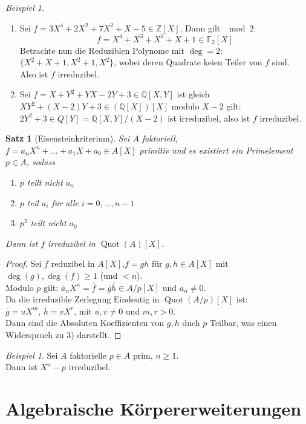 \documentclass[10pt,a4paper]{article}
\newcommand{\Z}{\ensuremath{\mathbb{Z}}}
\newcommand{\Q}{\ensuremath{\mathbb{Q}}}
\newcommand{\ol}[1]{\overline{#1}}
\newcommand{\Quot}{\operatorname{Quot}}
\newcounter{thm}[section]
\theoremstyle{definition}
\theoremstyle{plain}
\newtheorem{satz}[thm]{Satz}
\theoremstyle{remark}
\newtheorem{exm}[thm]{Beispiel}
\newtheorem*{exm*}{Beispiel}
\begin{document}
\begin{exm*}
	\begin{enumerate}
		\item Sei $f=3X^4+2X^2+7X^2+X-5\in \Z[X]$. Dann gilt $\mod 2$:
		\[f=X^4+X^3+X^2+X+1\in\mathbb{F}_2[X]\]
		Betrachte nun die Reduziblen Polynome mit $\deg=2$:
		$\{X^2+X+1,X^2+1,X^2\}$, wobei deren Quadrate keien Teiler von $f$ sind.\\
		Also ist $f$ irreduzibel.
		\item Sei $f=X+Y^2+YX-2Y+3\in\Q[X,Y]$ ist gleich $XY^2+(X-2)Y+3\in(\Q[X])[X]$ modulo $X-2$ gilt:\\
		$2Y^2+3\in Q[Y]=\Q[X,Y]/(X-2)$ ist irreduzibel, also ist $f$ irreduzibel.
	\end{enumerate}
\end{exm*}


\begin{satz}[Eisensteinkriterium]\label{707Eisenstein}
	Sei $A$ faktoriell, $f=a_nX^n+...+a_1X+a_0\in A[X]$ primitiv und es existiert ein Primelement $p\in A$, sodass
	\begin{enumerate}
		\item $p$ teilt nicht $a_n$
		\item $p$ teil $a_i$ für alle $i=0,...,n-1$
		\item $p^2$ teilt nicht $a_0$
	\end{enumerate}
	Dann ist $f$ irreduzibel in $\Quot(A)[X]$.
\end{satz}
\begin{proof}
	Sei $f$ reduzibel in $A[X]$,$f=gh$ für $g,h\in A[X]$ mit $\deg(g),\deg(f)\geq 1$ (und $<n$).\\
	Modulo $p$ gilt: $\ol a_nX^n=\ol f=\ol g\ol h\in A/p[X]$ und $a_n\neq 0$.\\
	Da die irreduzible Zerlegung Eindeutig in $\Quot(A/p)[X]$ ist:\\
	$\ol g=uX^m$, $\ol h=vX^r$, mit $u,v\neq 0$ und $m,r>0$.\\
	Dann sind die Absoluten Koeffizienten von $g,h$ duch $p$ Teilbar, was einen Widerspruch zu 3) darstellt.
\end{proof}

\begin{exm}
	Sei $A$ faktorielle $p\in A$ prim, $n\geq 1$.\\
	Dann ist $X^n-p$ irreduzibel.
\end{exm}

\section{Algebraische Körpererweiterungen}
\end{document}
